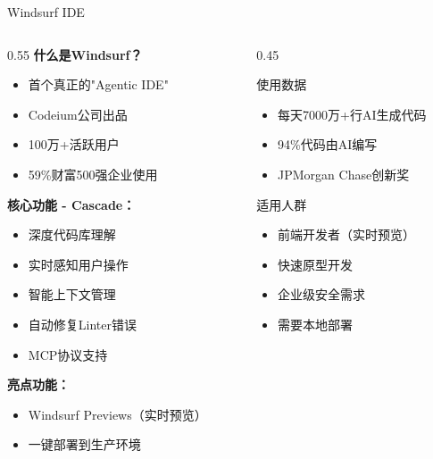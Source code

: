 \documentclass[aspectratio=169,11pt]{beamer}
\begin{document}
\begin{frame}{Windsurf IDE}
    \begin{columns}
        \begin{column}{0.55\textwidth}
            \textbf{什么是Windsurf？}
            \begin{itemize}
                \item 首个真正的"Agentic IDE"
                \item Codeium公司出品
                \item 100万+活跃用户
                \item 59\%财富500强企业使用
            \end{itemize}
            
            \vspace{0.3cm}
            \textbf{核心功能 - Cascade：}
            \begin{itemize}
                \item 深度代码库理解
                \item 实时感知用户操作
                \item 智能上下文管理
                \item 自动修复Linter错误
                \item MCP协议支持
            \end{itemize}
            
            \vspace{0.3cm}
            \textbf{亮点功能：}
            \begin{itemize}
                \item Windsurf Previews（实时预览）
                \item 一键部署到生产环境
            \end{itemize}
        \end{column}
        \begin{column}{0.45\textwidth}
            \begin{block}{使用数据}
                \begin{itemize}
                    \item 每天7000万+行AI生成代码
                    \item 94\%代码由AI编写
                    \item JPMorgan Chase创新奖
                \end{itemize}
            \end{block}
            
            \vspace{0.3cm}
            \begin{exampleblock}{适用人群}
                \begin{itemize}
                    \item 前端开发者（实时预览）
                    \item 快速原型开发
                    \item 企业级安全需求
                    \item 需要本地部署
                \end{itemize}
            \end{exampleblock}
            

\end{column}
\end{columns}
\end{frame}
\end{document}
